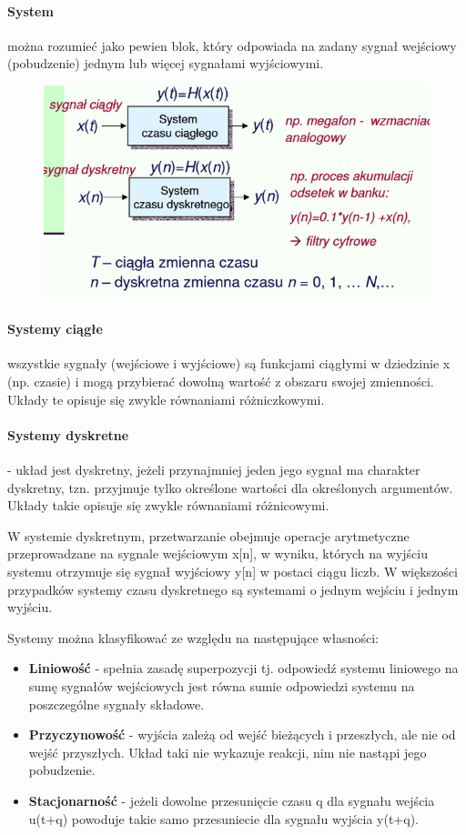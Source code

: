 \documentclass[a4paper,twoside]{report}
\begin{document}
\paragraph{System} można rozumieć jako pewien  blok, który odpowiada na zadany sygnał wejściowy (pobudzenie) jednym lub więcej sygnałami wyjściowymi.

\begin{figure}[htbp]
\centering
\includegraphics[scale=0.5]{obrazy/ciagle_dyskretne.png}
\end{figure}

\paragraph{Systemy ciągłe} wszystkie sygnały (wejściowe i wyjściowe) są funkcjami ciągłymi w dziedzinie x (np. czasie) i mogą przybierać dowolną wartość z obszaru swojej zmienności. Układy te opisuje się zwykle równaniami różniczkowymi. 

\paragraph{Systemy dyskretne} - układ jest dyskretny, jeżeli przynajmniej jeden jego sygnał ma charakter dyskretny, tzn. przyjmuje tylko określone wartości dla określonych argumentów. Układy takie opisuje się zwykle równaniami różnicowymi. 

W systemie dyskretnym, przetwarzanie
obejmuje operacje arytmetyczne 
przeprowadzane na sygnale wejściowym 
x[n], w wyniku, których na wyjściu systemu otrzymuje się sygnał wyjściowy y[n] w postaci ciągu liczb. W większości przypadków systemy czasu dyskretnego są systemami o jednym wejściu i jednym wyjściu.

Systemy można klasyfikować ze względu na następujące własności:
\begin{itemize}
\item \textbf{Liniowość} - spełnia zasadę superpozycji tj. odpowiedź systemu liniowego na sumę sygnałów wejściowych jest równa sumie odpowiedzi systemu na poszczególne sygnały składowe.
\item \textbf{Przyczynowość} - wyjścia zależą od wejść bieżących i przeszłych, ale nie od wejść przyszłych. Układ taki nie wykazuje reakcji, nim nie nastąpi jego pobudzenie. 
\item \textbf{Stacjonarność} - jeżeli dowolne przesunięcie czasu q dla sygnału wejścia u(t+q) powoduje takie samo przesuniecie dla sygnału wyjścia y(t+q).
\end{itemize}
\end{document}
